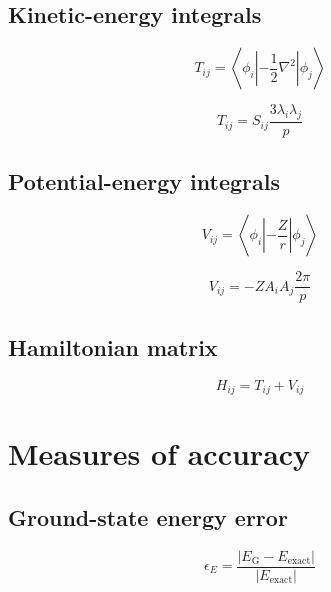 \subsection{Kinetic-energy integrals}

\begin{equation}
    T_{ij}=
    \left\langle
    \phi_i\left|
    -\frac{1}{2}\nabla^2
    \right|\phi_j
    \right\rangle
\end{equation}

\begin{equation}
    T_{ij}=
    S_{ij}\frac{3\lambda_i\lambda_j}{p}
    \label{eq:kinetic_matrix}
\end{equation}


\subsection{Potential-energy integrals}

\begin{equation}
    V_{ij}=
    \left\langle
    \phi_i\left|-\frac{Z}{r}\right|
    \phi_j\right\rangle
\end{equation}

\begin{equation}
    V_{ij}=
    -ZA_iA_j\frac{2\pi}{p}
    \label{eq:potential_matrix}
\end{equation}


\subsection{Hamiltonian matrix}

\begin{equation}
    H_{ij}=T_{ij}+V_{ij}
    \label{eq:hamiltonian_matrix}
\end{equation}



\section{Measures of accuracy}

\subsection{Ground-state energy error}

\begin{equation}
    \epsilon_E=
    \frac{|E_{\mathrm G}-E_{\mathrm{exact}}|}
    {|E_{\mathrm{exact}}|}
    \label{eq:relative_energy_error}
\end{equation}



